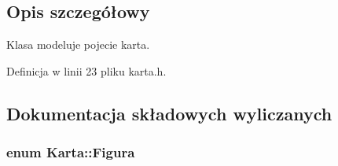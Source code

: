\subsection{Opis szczegółowy}
Klasa modeluje pojecie karta. 

Definicja w linii 23 pliku karta.\-h.



\subsection{Dokumentacja składowych wyliczanych}
\hypertarget{class_karta_a7f71c15a03e9b8d4103c8734f2ec1f1b}{
\subsubsection[{Figura}]{\setlength{\rightskip}{0pt plus 5cm}enum {\bf Karta\-::\-Figura}}}\label{class_karta_a7f71c15a03e9b8d4103c8734f2ec1f1b}
